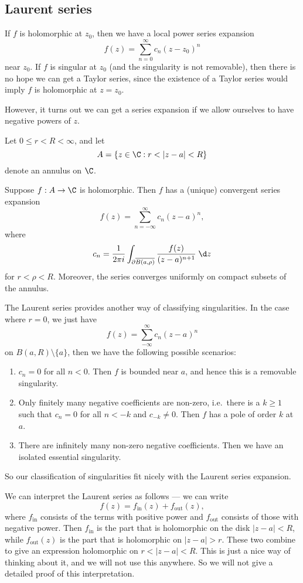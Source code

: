 \documentclass[a4paper]{article}
\begin{document}
\subsection{Laurent series}
If $f$ is holomorphic at $z_0$, then we have a local power series expansion
\[
  f(z) = \sum_{n = 0}^\infty c_n (z - z_0)^n
\]
near $z_0$. If $f$ is singular at $z_0$ (and the singularity is not removable), then there is no hope we can get a Taylor series, since the existence of a Taylor series would imply $f$ is holomorphic at $z = z_0$.

However, it turns out we can get a series expansion if we allow ourselves to have negative powers of $z$.

\begin{thm}
  Let $0 \leq r < R < \infty$, and let
  \[
    A = \{z \in \C: r < |z - a| < R\}
  \]
  denote an annulus on $\C$.

  Suppose $f: A \to \C$ is holomorphic. Then $f$ has a (unique) convergent series expansion
  \[
    f(z) = \sum_{n = -\infty}^\infty c_n (z - a)^n,
  \]
  where
  \[
    c_n = \frac{1}{2\pi i} \int_{\partial \overline{B(a, \rho)}} \frac{f(z)}{(z - a)^{n + 1}}\;\d z
  \]
  for $r < \rho < R$. Moreover, the series converges uniformly on compact subsets of the annulus.
\end{thm}

The Laurent series provides another way of classifying singularities. In the case where $r = 0$, we just have
\[
  f(z) = \sum_{-\infty}^\infty c_n (z - a)^n
\]
on $B(a, R) \setminus \{a\}$, then we have the following possible scenarios:
\begin{enumerate}
  \item $c_n = 0$ for all $n < 0$. Then $f$ is bounded near $a$, and hence this is a removable singularity.
  \item Only finitely many negative coefficients are non-zero, i.e.\ there is a $k \geq 1$ such that $c_n = 0$ for all $n < -k$ and $c_{-k} \not= 0$. Then $f$ has a pole of order $k$ at $a$.
  \item There are infinitely many non-zero negative coefficients. Then we have an isolated essential singularity.
\end{enumerate}
So our classification of singularities fit nicely with the Laurent series expansion.

We can interpret the Laurent series as follows --- we can write
\[
  f(z) = f_{\mathrm{in}}(z) + f_{\mathrm{out}}(z),
\]
where $f_{\mathrm{in}}$ consists of the terms with positive power and $f_{\mathrm{out}}$ consists of those with negative power. Then $f_{\mathrm{in}}$ is the part that is holomorphic on the disk $|z - a| < R$, while $f_{\mathrm{out}}(z)$ is the part that is holomorphic on $|z - a| > r$. These two combine to give an expression holomorphic on $r < |z - a| < R$. This is just a nice way of thinking about it, and we will not use this anywhere. So we will not give a detailed proof of this interpretation.
\end{document}
